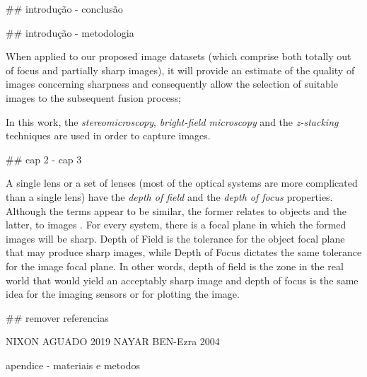 ## introdução - conclusão

## introdução - metodologia

When applied to our proposed image datasets (which comprise both totally out of focus and partially sharp images), it will provide an estimate of the quality of images concerning sharpness and consequently allow the selection of suitable images to the subsequent fusion process;

In this work, the \emph{stereomicroscopy}, \emph{bright-field microscopy} and the \emph{z-stacking} techniques are used in order to capture images.

## cap 2 - cap 3

A single lens or a set of lenses (most of the optical systems are more complicated than a single lens) have the \emph{depth of field} and the \emph{depth of focus} properties. Although the terms appear to be similar, the former relates to objects and the latter, to images \cite{davidson2002optical}. For every system, there is a focal plane in which the formed images will be sharp. Depth of Field is the tolerance for the object focal plane that may produce sharp images, while Depth of Focus dictates the same tolerance for the image focal plane. In other words, depth of field is the zone in the real world that would yield an acceptably sharp image and depth of focus is the same idea for the imaging sensors or for plotting the image.

## remover referencias

NIXON AGUADO 2019
NAYAR BEN-Ezra 2004

apendice - materiais e metodos

